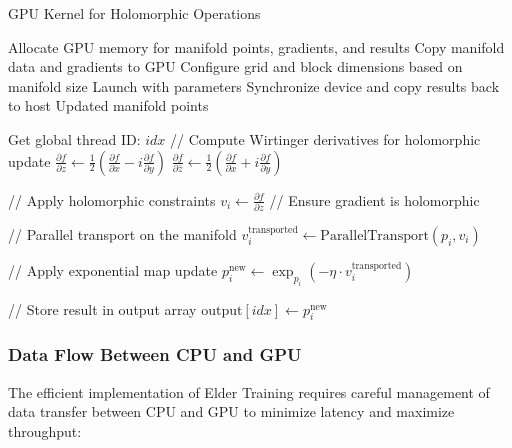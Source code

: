 \begin{algorithm}
\caption{GPU Kernel for Holomorphic Operations}
\begin{algorithmic}[1]
    \State Allocate GPU memory for manifold points, gradients, and results
    \State Copy manifold data and gradients to GPU
    \State Configure grid and block dimensions based on manifold size
    \State Launch  with parameters
    \State Synchronize device and copy results back to host
    \State \Return Updated manifold points
\EndFunction

\State

    \State Get global thread ID: $idx$
        \State // Compute Wirtinger derivatives for holomorphic update
        \State $\frac{\partial f}{\partial z} \gets \frac{1}{2}\left(\frac{\partial f}{\partial x} - i\frac{\partial f}{\partial y}\right)$
        \State $\frac{\partial f}{\partial \bar{z}} \gets \frac{1}{2}\left(\frac{\partial f}{\partial x} + i\frac{\partial f}{\partial y}\right)$
        
        \State // Apply holomorphic constraints
        \State $v_i \gets \frac{\partial f}{\partial z}$ // Ensure gradient is holomorphic
        
        \State // Parallel transport on the manifold
        \State $v_i^{\text{transported}} \gets \text{ParallelTransport}(p_i, v_i)$
        
        \State // Apply exponential map update
        \State $p_i^{\text{new}} \gets \exp_{p_i}(-\eta \cdot v_i^{\text{transported}})$
        
        \State // Store result in output array
        \State $\text{output}[idx] \gets p_i^{\text{new}}$
    \EndIf
\EndFunction
\end{algorithmic}
\end{algorithm}

\subsubsection{Data Flow Between CPU and GPU}

The efficient implementation of Elder Training requires careful management of data transfer between CPU and GPU to minimize latency and maximize throughput:

